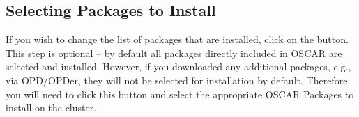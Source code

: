 
\subsection{Selecting Packages to Install}
\label{det:select-packages}

\optional

If you wish to change the list of packages that are installed, click
on the  button.  This step is
optional -- by default all packages directly included in OSCAR are
selected and installed.  However, if you downloaded any additional packages,
e.g., via OPD/OPDer, they will not be selected for installation by default.
Therefore you will need to click this button and select the appropriate OSCAR
Packages to install on the cluster.

